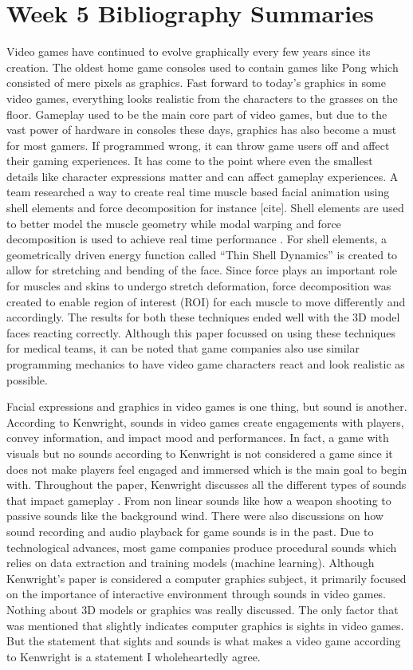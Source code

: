 \documentclass{article}
\begin{document}
\section{Week 5 Bibliography Summaries}

Video games have continued to evolve graphically every few years since its creation. The oldest home game consoles used to contain games like Pong which consisted of mere pixels as graphics. Fast forward to today's graphics in some video games, everything looks realistic from the characters to the grasses on the floor. Gameplay used to be the main core part of video games, but due to the vast power of hardware in consoles these days, graphics has also become a must for most gamers. If programmed wrong, it can throw game users off and affect their gaming experiences.  It has come to the point where even the smallest details like character expressions matter and can affect gameplay experiences. A team researched a way to create real time muscle based facial animation using shell elements and force decomposition for instance [cite]. Shell elements are used to better model the muscle geometry while modal warping and force decomposition is used to achieve real time performance \cite{10.1145/3384382.3384531}. For shell elements, a geometrically driven energy function called “Thin Shell Dynamics” is created to allow for stretching and bending of the face. Since force plays an important role for muscles and skins to undergo stretch deformation, force decomposition was created to enable region of interest (ROI) for each muscle to move differently and accordingly. The results for both these techniques ended well with the 3D model faces reacting correctly. Although this paper focussed on using these techniques for medical teams, it can be noted that game companies also use similar programming mechanics to have video game characters react and look realistic as possible.	

Facial expressions and graphics in video games is one thing, but sound is another. According to Kenwright, sounds in video games create engagements with players, convey information, and impact mood and performances. In fact, a game with visuals but no sounds according to Kenwright is not considered a game since it does not make players feel engaged and immersed which is the main goal to begin with. Throughout the paper, Kenwright discusses all the different types of sounds that impact gameplay \cite{9098089}. From non linear sounds like how a weapon shooting to passive sounds like the background wind. There were also discussions on how sound recording and audio playback for game sounds is in the past. Due to technological advances, most game companies produce procedural sounds which relies on data extraction and training models (machine learning). Although Kenwright’s paper is considered a computer graphics subject, it primarily focused on the importance of interactive environment through sounds in video games. Nothing about 3D models or graphics was really discussed. The only factor that was mentioned that slightly indicates computer graphics is sights in video games. But the statement that sights and sounds is what makes a video game according to Kenwright is a statement I wholeheartedly agree. 



\end{document}
